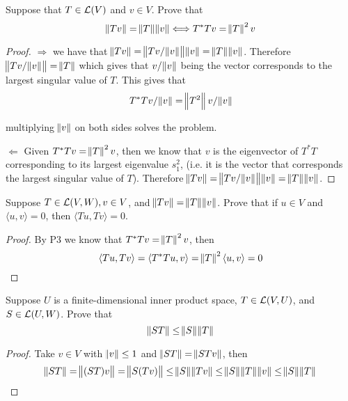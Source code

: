 \documentclass{extarticle}
\begin{document}
\begin{problem}{3}
    Suppose that \(T \in \mathcal{L}(V)\) and \(v \in V\). Prove that 
    \[\norm{Tv} = \norm{T} \norm{v} \Longleftrightarrow 
    T^* T v = \norm{T}^2 v\]
\end{problem}

\begin{proof}

\(\Rightarrow\) we have that 
\(\norm{Tv} = \norm{Tv / \norm{v}} \norm{v} = \norm{T} \norm{v}\). 
Therefore \(\norm{Tv / \norm{v}} = \norm{T}\) which 
gives that \(v/\norm{v}\) being the vector corresponds to the largest 
singular value of \(T\). This gives that  
\[T^*T v/\norm{v} = \norm{T^2}v / \norm{v}\]

multiplying \(\norm{v}\) on both sides solves the problem. 

\(\Leftarrow\) Given \(T^*Tv = \norm{T}^2 v\), then we know 
that \(v\) is the eigenvector of \(T^*T\) corresponding to 
its largest eigenvalue \(s_1^2\), (i.e. it is the vector 
that corresponds the largest singular value of \(T\)). 
Therefore \(\norm{Tv} =
\norm{Tv / \norm{v}} \norm{v}= \norm{T} \norm{v}\). 

\end{proof}


\begin{problem}{4}
    Suppose \(T \in \mathcal{L}(V, W), v \in V\), and 
    \(\norm{Tv} = \norm{T} \norm{v}\). Prove that if 
    \(u \in V\) and \(\langle u,v \rangle = 0\), then 
    \(\langle Tu,Tv \rangle = 0\).  
\end{problem}

\begin{proof}
By P3 we know that \(T^*T v = \norm{T}^2 v\), then 
\[\langle Tu,Tv \rangle 
= \langle T^*Tu,v \rangle = \norm{T}^2 \langle u,v \rangle = 0\]
\end{proof}

\begin{problem}{5}
    Suppose \(U\) is a finite-dimensional inner product 
    space, \(T \in \mathcal{L}(V, U)\), and \(S \in \mathcal{L}(U, W)\).  
    Prove that 
    \[\norm{ST} \leq \norm{S} \norm{T}\]
\end{problem}

\begin{proof}

Take \(v \in V\) with \(\norm{v} \leq 1\) and 
\(\norm{ST} = \norm{ST v}\), then 
\begin{align*}
    \norm{ST} 
    = \norm{(ST)v} 
    = \norm{S(Tv)} 
    \leq \norm{S}\norm{Tv} 
    \leq \norm{S} \norm{T} \norm{v} 
    \leq \norm{S} \norm{T}
\end{align*}
\end{proof}
\end{document}
